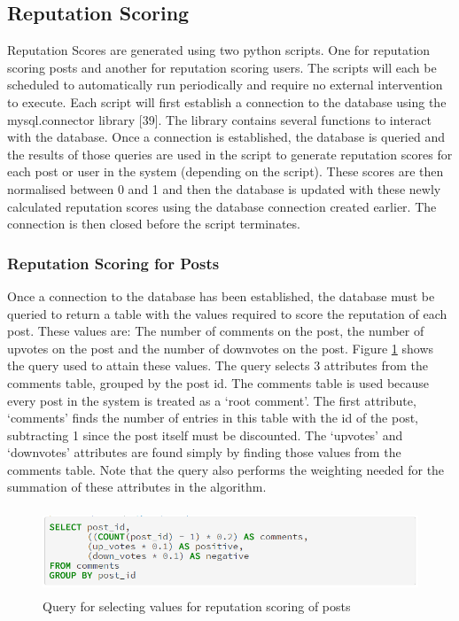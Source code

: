 \subsection{Reputation Scoring}
Reputation Scores are generated using two python scripts. One for reputation scoring posts and another for reputation scoring users. The scripts will each be scheduled to automatically run periodically and require no external intervention to execute. Each script will first establish a connection to the database using the mysql.connector library [39]. The library contains several functions to interact with the database. Once a connection is established, the database is queried and the results of those queries are used in the script to generate reputation scores for each post or user in the system (depending on the script). These scores are then normalised between 0 and 1 and then the database is updated with these newly calculated reputation scores using the database connection created earlier. The connection is then closed before the script terminates.

\subsubsection{Reputation Scoring for Posts}
Once a connection to the database has been established, the database must be queried to return a table with the values required to score the reputation of each post. These values are: The number of comments on the post, the number of upvotes on the post and the number of downvotes on the post. Figure \ref{fig:PostRepQuery} shows the query used to attain these values. The query selects 3 attributes from the comments table, grouped by the post id. The comments table is used because every post in the system is treated as a `root comment'. The first attribute, `comments' finds the number of entries in this table with the id of the post, subtracting 1 since the post itself must be discounted. The `upvotes' and 	`downvotes' attributes are found simply by finding those values from the comments table. Note that the query also performs the weighting needed for the summation of these attributes in the algorithm.

\begin{figure}[H]
\centering
\includegraphics[height=1in]{Images/Implementation/PostRepQuery}
\caption{Query for selecting values for reputation scoring of posts}
\label{fig:PostRepQuery}
\end{figure}


